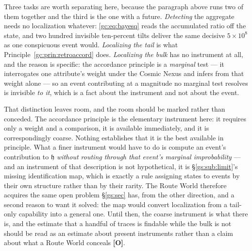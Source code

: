 \documentclass[11pt]{article}
\numberwithin{equation}{section}
\theoremstyle{plain}
\theoremstyle{definition}
\theoremstyle{remark}
\newcommand{\hm}{\mathfrak{h}}
\begin{document}
Three tasks are worth separating here, because the paragraph above runs
two of them together and the third is the one with a future.
\emph{Detecting} the aggregate needs no localization whatever:
\eqref{gc:eq:bayesq} reads the accumulated ratio off the state, and two
hundred invisible ten-percent tilts deliver the same decisive
$5\times10^{8}$ as one conspicuous event would. \emph{Localizing the
tail} is what Principle~\ref{gc:prin:retroaccord} does. \emph{Localizing
the bulk} has no instrument at all, and the reason is specific: the
accordance principle is a \emph{marginal} test --- it interrogates one
attribute's weight under the Cosmic Nexus and infers from that weight
alone --- so an event contributing at a magnitude no marginal test
resolves is invisible \emph{to it}, which is a fact about the instrument
and not about the event.

That distinction leaves room, and the room should be marked rather than
conceded. The accordance principle is the elementary instrument here: it
requires only a weight and a comparison, it is available immediately, and
it is correspondingly coarse. Nothing establishes that it is the best
available in principle. What a finer instrument would have to do is
compute an event's contribution to $\hm$ \emph{without routing through
that event's marginal improbability} --- and an instrument of that
description is not hypothetical, it is
\S\ref{gs:sub:limit}'s missing identification map, which is exactly a
rule assigning states to events by their own structure rather than by
their rarity. The Route World therefore acquires the same open problem
\S\ref{gs:sec} has, from the other direction, and a second reason to want
it solved: the map would convert localization from a tail-only
capability into a general one. Until then, the coarse instrument is what
there is, and the estimate that a handful of traces is findable while the
bulk is not should be read as an estimate about present instruments
rather than a claim about what a Route World conceals \textbf{[O]}.
\end{document}
